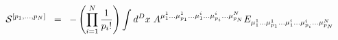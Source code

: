 \begin{equation}
{\cal{S}}^{[ p_1 ,..., p_N ]} \;\; =\;\; - \left( \prod_{i=1}^{N}
\frac{1}{p_i !} \right) \int d^D x \; A^{{\mu}^1_1 ...{\mu}^1_{p_1}
...{\mu}^i_1 ...{\mu}^i_{p_i} ...{\mu}^N_{p_N} } E_{{\mu}^1_1
...{\mu}^1_{p_1} ...{\mu}^i_1 ...{\mu}^i_{p_i} ...{\mu}^N_{p_N}}
\label{eq:4.26}
\end{equation}

